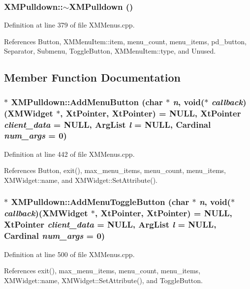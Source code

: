 \subsubsection{\setlength{\rightskip}{0pt plus 5cm}XMPulldown::$\sim$XMPulldown ()}\label{classXMPulldown_a2}




Definition at line 379 of file XMMenus.cpp.

References Button, XMMenu\-Item::item, menu\_\-count, menu\_\-items, pd\_\-button, Separator, Submenu, Toggle\-Button, XMMenu\-Item::type, and Unused.

\subsection{Member Function Documentation}
\subsubsection{ $\ast$ XMPulldown::Add\-Menu\-Button (char $\ast$ {\em n}, void($\ast$ {\em callback})({\bf XMWidget} $\ast$, Xt\-Pointer, Xt\-Pointer) = NULL, Xt\-Pointer {\em client\_\-data} = NULL, Arg\-List {\em l} = NULL, Cardinal {\em num\_\-args} = 0)}\label{classXMPulldown_a8}




Definition at line 442 of file XMMenus.cpp.

References Button, exit(), max\_\-menu\_\-items, menu\_\-count, menu\_\-items, XMWidget::name, and XMWidget::Set\-Attribute().
\subsubsection{ $\ast$ XMPulldown::Add\-Menu\-Toggle\-Button (char $\ast$ {\em n}, void($\ast$ {\em callback})({\bf XMWidget} $\ast$, Xt\-Pointer, Xt\-Pointer) = NULL, Xt\-Pointer {\em client\_\-data} = NULL, Arg\-List {\em l} = NULL, Cardinal {\em num\_\-args} = 0)}\label{classXMPulldown_a9}




Definition at line 500 of file XMMenus.cpp.

References exit(), max\_\-menu\_\-items, menu\_\-count, menu\_\-items, XMWidget::name, XMWidget::Set\-Attribute(), and Toggle\-Button.
